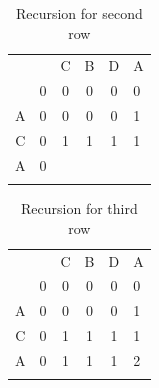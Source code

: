 \documentclass[a4paper,11pt]{book}
\begin{document}
\begin{table}[ht]
\centering
\begin{tabular}{cccccl}
                       &                        & C                      & B                      & D                      & A                      \\ \cline{2-6} 
\multicolumn{1}{c|}{}  & \multicolumn{1}{c|}{0} & \multicolumn{1}{c|}{0} & \multicolumn{1}{c|}{0} & \multicolumn{1}{c|}{0} & \multicolumn{1}{l|}{0} \\ \cline{2-6} 
\multicolumn{1}{c|}{A} & \multicolumn{1}{c|}{0} & \multicolumn{1}{c|}{0} & \multicolumn{1}{c|}{0} & \multicolumn{1}{c|}{0} & \multicolumn{1}{l|}{1} \\ \cline{2-6} 
\multicolumn{1}{c|}{C} & \multicolumn{1}{c|}{0} & \multicolumn{1}{c|}{1} & \multicolumn{1}{c|}{1} & \multicolumn{1}{c|}{1} & \multicolumn{1}{l|}{1} \\ \cline{2-6} 
\multicolumn{1}{c|}{A} & \multicolumn{1}{c|}{0} & \multicolumn{1}{c|}{}  & \multicolumn{1}{c|}{}  & \multicolumn{1}{c|}{}  & \multicolumn{1}{l|}{}  \\ \cline{2-6} 
\multicolumn{1}{l}{}   & \multicolumn{1}{l}{}   & \multicolumn{1}{l}{}   & \multicolumn{1}{l}{}   & \multicolumn{1}{l}{}   &                       
\end{tabular}
\caption{Recursion for second row}
\end{table}

\begin{table}[ht]
\centering
\begin{tabular}{cccccl}
                       &                        & C                      & B                      & D                      & A                      \\ \cline{2-6} 
\multicolumn{1}{c|}{}  & \multicolumn{1}{c|}{0} & \multicolumn{1}{c|}{0} & \multicolumn{1}{c|}{0} & \multicolumn{1}{c|}{0} & \multicolumn{1}{l|}{0} \\ \cline{2-6} 
\multicolumn{1}{c|}{A} & \multicolumn{1}{c|}{0} & \multicolumn{1}{c|}{0} & \multicolumn{1}{c|}{0} & \multicolumn{1}{c|}{0} & \multicolumn{1}{l|}{1} \\ \cline{2-6} 
\multicolumn{1}{c|}{C} & \multicolumn{1}{c|}{0} & \multicolumn{1}{c|}{1} & \multicolumn{1}{c|}{1} & \multicolumn{1}{c|}{1} & \multicolumn{1}{l|}{1} \\ \cline{2-6} 
\multicolumn{1}{c|}{A} & \multicolumn{1}{c|}{0} & \multicolumn{1}{c|}{1} & \multicolumn{1}{c|}{1} & \multicolumn{1}{c|}{1} & \multicolumn{1}{l|}{2} \\ \cline{2-6} 
\multicolumn{1}{l}{}   & \multicolumn{1}{l}{}   & \multicolumn{1}{l}{}   & \multicolumn{1}{l}{}   & \multicolumn{1}{l}{}   &                       
\end{tabular}
\caption{Recursion for third row}
\end{table}
\end{document}
